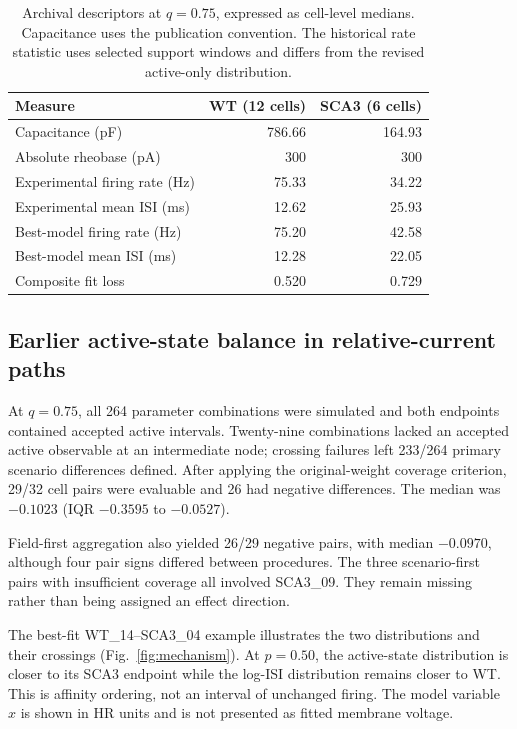 \documentclass[utf8]{FrontiersinHarvard}
\begin{document}
\begin{table}[htbp]\centering\small
\caption{Archival descriptors at $q=0.75$, expressed as cell-level medians. Capacitance uses the publication convention. The historical rate statistic uses selected support windows and differs from the revised active-only distribution.}\label{tab:endpoints}
\begin{tabularx}{\textwidth}{@{}Xrr@{}}\toprule Measure&WT (12 cells)&SCA3 (6 cells)\\\midrule
Capacitance (pF)&786.66&164.93\\
Absolute rheobase (pA)&300&300\\
Experimental firing rate (Hz)&75.33&34.22\\
Experimental mean ISI (ms)&12.62&25.93\\
Best-model firing rate (Hz)&75.20&42.58\\
Best-model mean ISI (ms)&12.28&22.05\\
Composite fit loss&0.520&0.729\\\bottomrule\end{tabularx}\end{table}

\subsection{Earlier active-state balance in relative-current paths}\label{sec:primary}
At $q=0.75$, all 264 parameter combinations were simulated and both endpoints contained accepted active intervals. Twenty-nine combinations lacked an accepted active observable at an intermediate node; crossing failures left 233/264 primary scenario differences defined. After applying the original-weight coverage criterion, 29/32 cell pairs were evaluable and 26 had negative differences. The median was $-0.1023$ (IQR $-0.3595$ to $-0.0527$).

Field-first aggregation also yielded 26/29 negative pairs, with median $-0.0970$, although four pair signs differed between procedures. The three scenario-first pairs with insufficient coverage all involved SCA3\_09. They remain missing rather than being assigned an effect direction.

The best-fit WT\_14--SCA3\_04 example illustrates the two distributions and their crossings (Fig.~\ref{fig:mechanism}). At $p=0.50$, the active-state distribution is closer to its SCA3 endpoint while the log-ISI distribution remains closer to WT. This is affinity ordering, not an interval of unchanged firing. The model variable $x$ is shown in HR units and is not presented as fitted membrane voltage.
\end{document}
